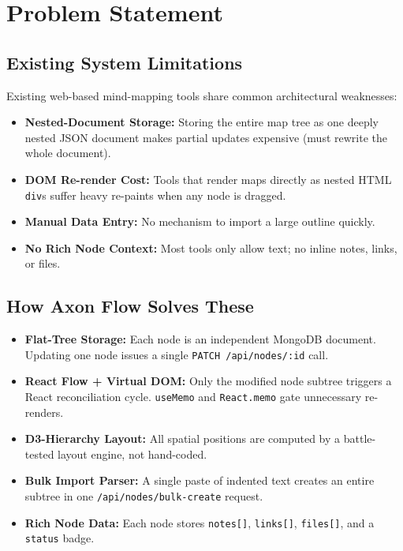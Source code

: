 \documentclass[12pt, a4paper]{article}
\begin{document}
\section{Problem Statement}

\subsection{Existing System Limitations}
Existing web-based mind-mapping tools share common architectural weaknesses:
\begin{itemize}[noitemsep]
  \item \textbf{Nested-Document Storage:} Storing the entire map tree as one deeply nested JSON document makes partial updates expensive (must rewrite the whole document).
  \item \textbf{DOM Re-render Cost:} Tools that render maps directly as nested HTML \texttt{div}s suffer heavy re-paints when any node is dragged.
  \item \textbf{Manual Data Entry:} No mechanism to import a large outline quickly.
  \item \textbf{No Rich Node Context:} Most tools only allow text; no inline notes, links, or files.
\end{itemize}

\subsection{How Axon Flow Solves These}
\begin{itemize}[noitemsep]
  \item \textbf{Flat-Tree Storage:} Each node is an independent MongoDB document. Updating one node issues a single \texttt{PATCH /api/nodes/:id} call.
  \item \textbf{React Flow + Virtual DOM:} Only the modified node subtree triggers a React reconciliation cycle. \texttt{useMemo} and \texttt{React.memo} gate unnecessary re-renders.
  \item \textbf{D3-Hierarchy Layout:} All spatial positions are computed by a battle-tested layout engine, not hand-coded.
  \item \textbf{Bulk Import Parser:} A single paste of indented text creates an entire subtree in one \texttt{/api/nodes/bulk-create} request.
  \item \textbf{Rich Node Data:} Each node stores \texttt{notes[]}, \texttt{links[]}, \texttt{files[]}, and a \texttt{status} badge.
\end{itemize}
\end{document}
